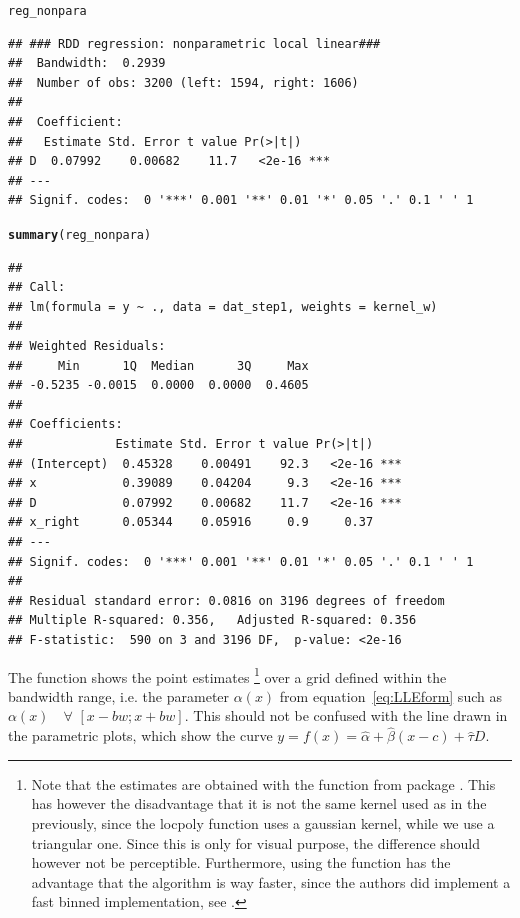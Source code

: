 \documentclass[english,nojss]{jss}\usepackage{graphicx, color}
\makeatletter
\newcommand{\hlfunctioncall}[1]{\textcolor[rgb]{0.501960784313725,0,0.329411764705882}{\textbf{#1}}}%
\newenvironment{kframe}{%
 \def\at@end@of@kframe{}%
 \ifinner\ifhmode%
  \def\at@end@of@kframe{\end{minipage}}%
  \begin{minipage}{\columnwidth}%
 \fi\fi%
 \def\FrameCommand##1{\hskip\@totalleftmargin \hskip-\fboxsep
 \colorbox{shadecolor}{##1}\hskip-\fboxsep
     \hskip-\linewidth \hskip-\@totalleftmargin \hskip\columnwidth}%
 \MakeFramed {\advance\hsize-\width
   \@totalleftmargin\z@ \linewidth\hsize
   \@setminipage}}%
 {\par\unskip\endMakeFramed%
 \at@end@of@kframe}
\newenvironment{knitrout}{}{} %
\makeatother
\begin{document}
\begin{knitrout}
\color{fgcolor}\begin{kframe}
\begin{alltt}
reg_nonpara
\end{alltt}
\begin{verbatim}
## ### RDD regression: nonparametric local linear###
## 	Bandwidth:  0.2939 
## 	Number of obs: 3200 (left: 1594, right: 1606)
## 
## 	Coefficient:
##   Estimate Std. Error t value Pr(>|t|)    
## D  0.07992    0.00682    11.7   <2e-16 ***
## ---
## Signif. codes:  0 '***' 0.001 '**' 0.01 '*' 0.05 '.' 0.1 ' ' 1
\end{verbatim}
\begin{alltt}
\hlfunctioncall{summary}(reg_nonpara)
\end{alltt}
\begin{verbatim}
## 
## Call:
## lm(formula = y ~ ., data = dat_step1, weights = kernel_w)
## 
## Weighted Residuals:
##     Min      1Q  Median      3Q     Max 
## -0.5235 -0.0015  0.0000  0.0000  0.4605 
## 
## Coefficients:
##             Estimate Std. Error t value Pr(>|t|)    
## (Intercept)  0.45328    0.00491    92.3   <2e-16 ***
## x            0.39089    0.04204     9.3   <2e-16 ***
## D            0.07992    0.00682    11.7   <2e-16 ***
## x_right      0.05344    0.05916     0.9     0.37    
## ---
## Signif. codes:  0 '***' 0.001 '**' 0.01 '*' 0.05 '.' 0.1 ' ' 1 
## 
## Residual standard error: 0.0816 on 3196 degrees of freedom
## Multiple R-squared: 0.356,	Adjusted R-squared: 0.356 
## F-statistic:  590 on 3 and 3196 DF,  p-value: <2e-16
\end{verbatim}
\end{kframe}
\end{knitrout}


The  function shows the point estimates%
\footnote{Note that the estimates are obtained with the  function
from package . This has however the disadvantage
that it is not the same kernel used as in the previously, since the
locpoly function uses a gaussian kernel, while we use a triangular
one. Since this is only for visual purpose, the difference should
however not be perceptible. Furthermore, using the 
function has the advantage that the algorithm is way faster, since
the authors did implement a fast binned implementation, see \citet[section 3.6]{FanGijbels1996}. %
} over a grid defined within the bandwidth range, i.e. the parameter
$\alpha(x)$ from equation~\ref{eq:LLEform} such as $\alpha(x)\quad$$\forall$
$[x-bw;x+bw]$. This should not be confused with the line drawn in
the parametric plots, which show the curve $y=f(x)=\hat{\alpha}+\hat{\beta}(x-c)+\hat{\tau}D$. 
\end{document}
